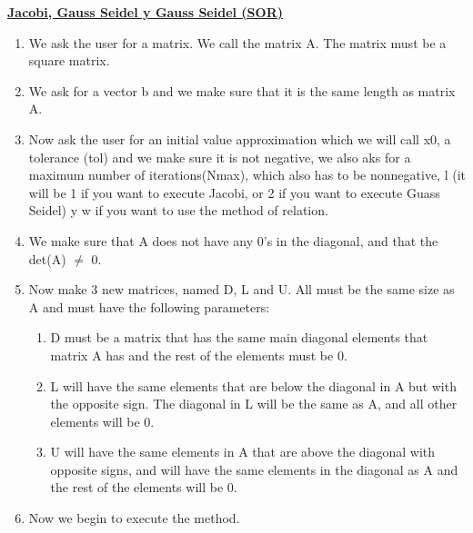 \documentclass[12pt]{article}
\renewcommand{\_}{\kern-1.5pt\textunderscore\kern-1.5pt}
\begin{document}
\textbf{\uline{Jacobi, Gauss Seidel y Gauss Seidel (SOR)}}\par


\vspace{\baselineskip}
\begin{enumerate}
	\item We ask the user for a matrix. We call the matrix A. The matrix must be a square matrix.\par

	\item We ask for a vector b and we make sure that it is the same length as matrix A.\par

	\item Now ask the user for an initial value approximation which we will call x0, a tolerance (tol) and we make sure it is not negative, we also aks for a maximum number of iterations(Nmax), which also has to be nonnegative, l (it will be 1 if you want to execute Jacobi, or 2 if you want to execute Guass Seidel) y w if you want to use the method of relation. \par

	\item We make sure that A does not have any 0’s in the diagonal, and that the det(A) $ \neq $  0. \par

	\item Now make 3 new matrices, named D, L and U. All must be the same size as A and must have the following parameters:\par

\begin{enumerate}
	\item  D must be a matrix that has the same main diagonal elements that matrix A has and the rest of the elements must be 0.\par

	\item  L will have the same elements that are below the diagonal in A but with the opposite sign. The diagonal in L will be the same as A, and all other elements will be 0. \par

	\item U will have the same elements in A that are above the diagonal with opposite signs, and will have the same elements in the diagonal as A and the rest of the elements will be 0.\par


\end{enumerate}
	\item Now we begin to execute the method. \par


\end{enumerate}
\end{document}
